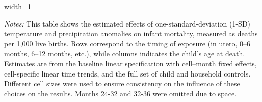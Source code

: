 \documentclass[a4paper]{article}
\begin{document}
\begin{appendix}

\begin{table}[]
    \centering
    \caption{Main Specification Heterogeneity}
    \label{tab:placeholder}
    \begin{adjustbox}{width=1\textwidth}
    
    \end{adjustbox}
    \raggedright
    \scriptsize \textit{Notes:} This table shows the estimated effects of one-standard-deviation (1-SD) temperature and precipitation anomalies on infant mortality, measured as deaths per 1,000 live births. Rows correspond to the timing of exposure (in utero, 0–6 months, 6–12 months, etc.), while columns indicates the child’s age at death. Estimates are from the baseline linear specification with cell–month fixed effects, cell-specific linear time trends, and the full set of child and household controls. Different cell sizes were used to ensure consistency on the influence of these choices on the results. Months 24-32 and 32-36 were omitted due to space.
\end{table}


\end{appendix}



\printbibliography
\end{document}
